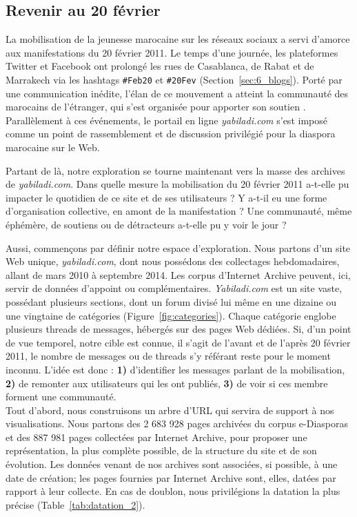 \documentclass[symmetric,justified,marginals=raggedouter]{tufte-book}
\begin{document}
\subsection{Revenir au 20 février}

\noindent La mobilisation de la jeunesse marocaine sur les réseaux sociaux a servi d'amorce aux manifestations du 20 février 2011. Le temps d'une journée, les plateformes Twitter et Facebook ont prolongé les rues de Casablanca, de Rabat et de Marrakech via les hashtags \texttt{\#Feb20} et \texttt{\#20Fev} (Section~\ref{sec:6_blogs}). Porté par une communication inédite, l'élan de ce mouvement a atteint la communauté des marocains de l'étranger, qui s'est orga\-nisée pour apporter son soutien \citep{desrues_mouvement_2012}. Parallèlement à ces événements, le portail en ligne \textit{yabiladi.com} s'est imposé comme un point de rassemblement et de discussion privilégié pour la diaspora marocaine sur le Web. 

Partant de là, notre exploration se tourne maintenant vers la masse des archives de \textit{yabiladi.com}. Dans quelle mesure la mobilisation du 20 février 2011 a-t-elle pu impacter le quotidien de ce site et de ses utilisateurs ? Y a-t-il eu une forme d'organisation collective, en amont de la manifestation ? Une communauté, même éphémère, de soutiens ou de détracteurs a-t-elle pu y voir le jour ?

Aussi, commençons par définir notre espace d'exploration. Nous partons d'un site Web unique, \textit{yabiladi.com}, dont nous possédons des collectages hebdomadaires, allant de mars 2010 à septembre 2014. Les corpus d'Internet Archive peuvent, ici, servir de données d'appoint ou complémentaires. \textit{Yabiladi.com} est un site vaste, possédant plusieurs sections, dont un forum divisé lui même en une dizaine ou une vingtaine de catégories (Figure~\ref{fig:categories}). Chaque catégorie englobe plusieurs threads de messages, hébergés sur des pages Web dédiées. Si, d'un point de vue temporel, notre cible est connue, il s'agit de l'avant et de l'après 20 février 2011, le nombre de messages ou de threads s'y référant reste pour le moment inconnu. L'idée est donc : \textbf{1)} d'identifier les messages parlant de la mobilisation, \textbf{2)} de remonter aux utilisateurs qui les ont publiés, \textbf{3)} de voir si ces membre forment une communauté. \\   

\noindent Tout d'abord, nous construisons un arbre d'URL qui servira de support à nos visualisations. Nous partons des 2 683 928 pages archivées du corpus e-Diasporas et des 887 981 pages collectées par Internet Archive, pour proposer une représentation, la plus complète possible, de la structure du site et de son évolution. Les données venant de nos archives sont associées, si possible, à une date de création; les pages fournies par Internet Archive sont, elles, datées par rapport à leur collecte. En cas de doublon, nous privilégions la datation la plus précise (Table~\ref{tab:datation_2}).
\end{document}
